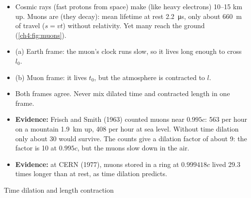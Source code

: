 \begin{sidebyside}[0.46]
\begin{itemize}
    \item Cosmic rays (fast protons from space) make  (like heavy electrons)
          10--15 km up. Muons are  (they decay):
          mean lifetime at rest \qty{2.2}{\micro\second}, only about \qty{660}{m} of travel
          ($s = vt$) without relativity. Yet many reach the ground (\cref{ch4:fig:muons}).
    \item (a) Earth frame: the muon's clock runs slow, so it lives long enough to cross $l_0$.
    \item (b) Muon frame: it lives $t_0$, but the atmosphere is contracted to $l$.
    \item Both frames agree. Never mix dilated time and contracted length in one frame.
  \end{itemize}
\end{sidebyside}
\begin{itemize}
  \item \textbf{Evidence:} Frisch and Smith (1963) counted muons near $0.995c$: 563 per hour on
        a mountain \qty{1.9}{km} up, 408 per hour at sea level. Without time dilation only about
        30 would survive. The counts give a dilation factor of about 9: the factor is 10 at
        $0.995c$, but the muons slow down in the air.
  \item \textbf{Evidence:} at CERN (1977), muons stored in a ring at $0.999418c$ lived 29.3
        times longer than at rest, as time dilation predicts.
\end{itemize}

\begin{formulacard}[unbreakable]{Time dilation and length contraction}
  \begin{symbols}
  \end{symbols}
\end{formulacard}

